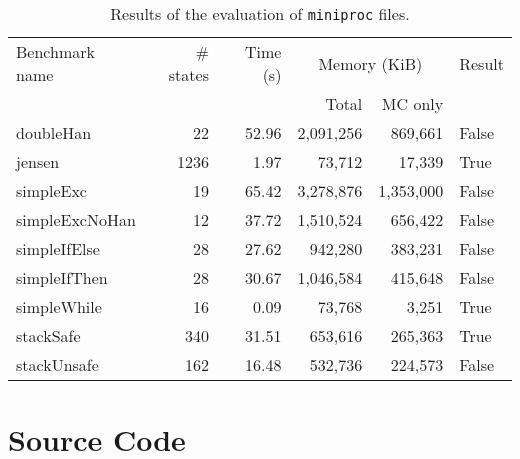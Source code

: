 \documentclass[9pt,a4paper]{article}
\begin{document}
\begin{table}
  \centering
  \begin{tabular}{| l | r | r | r | r | l |}
    \hline
    Benchmark name & \# states & Time (s) & \multicolumn{2}{c|}{Memory (KiB)} & Result \\
    \cline{4-5}
    & & & Total & MC only & \\
    \hline
    doubleHan      &   22 & 52.96 & 2,091,256 &   869,661 & False \\
    jensen         & 1236 &  1.97 &    73,712 &    17,339 & True \\
    simpleExc      &   19 & 65.42 & 3,278,876 & 1,353,000 & False \\
    simpleExcNoHan &   12 & 37.72 & 1,510,524 &   656,422 & False \\
    simpleIfElse   &   28 & 27.62 &   942,280 &   383,231 & False \\
    simpleIfThen   &   28 & 30.67 & 1,046,584 &   415,648 & False \\
    simpleWhile    &   16 &  0.09 &    73,768 &     3,251 & True \\
    stackSafe      &  340 & 31.51 &   653,616 &   265,363 & True \\
    stackUnsafe    &  162 & 16.48 &   532,736 &   224,573 & False \\
    \hline
  \end{tabular}
  \caption{Results of the evaluation of \texttt{miniproc} files.}
  \label{tab:exp-miniproc}
\end{table}


\section{Source Code}
\label{sec:sources}
\end{document}
